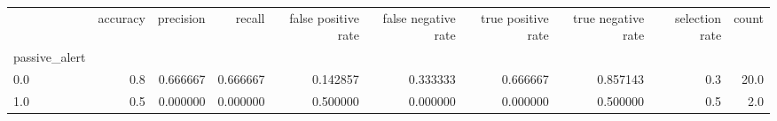 \begin{tabular}{lrrrrrrrrr}
\toprule
{} &  accuracy &  precision &    recall &  false positive rate &  false negative rate &  true positive rate &  true negative rate &  selection rate &  count \\
passive\_alert &           &            &           &                      &                      &                     &                     &                 &        \\
\midrule
0.0           &       0.8 &   0.666667 &  0.666667 &             0.142857 &             0.333333 &            0.666667 &            0.857143 &             0.3 &   20.0 \\
1.0           &       0.5 &   0.000000 &  0.000000 &             0.500000 &             0.000000 &            0.000000 &            0.500000 &             0.5 &    2.0 \\
\bottomrule
\end{tabular}
